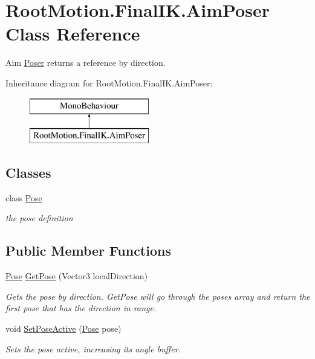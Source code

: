 \hypertarget{class_root_motion_1_1_final_i_k_1_1_aim_poser}{}\section{Root\+Motion.\+Final\+I\+K.\+Aim\+Poser Class Reference}
\label{class_root_motion_1_1_final_i_k_1_1_aim_poser}


Aim \mbox{\hyperlink{class_root_motion_1_1_final_i_k_1_1_poser}{Poser}} returns a reference by direction.  


Inheritance diagram for Root\+Motion.\+Final\+I\+K.\+Aim\+Poser\+:\begin{figure}[H]
\begin{center}
\leavevmode
\includegraphics[height=2.000000cm]{class_root_motion_1_1_final_i_k_1_1_aim_poser}
\end{center}
\end{figure}
\subsection*{Classes}
\begin{DoxyCompactItemize}
\item 
class \mbox{\hyperlink{class_root_motion_1_1_final_i_k_1_1_aim_poser_1_1_pose}{Pose}}
\begin{DoxyCompactList}\small\item\em the pose definition \end{DoxyCompactList}\end{DoxyCompactItemize}
\subsection*{Public Member Functions}
\begin{DoxyCompactItemize}
\item 
\mbox{\hyperlink{class_root_motion_1_1_final_i_k_1_1_aim_poser_1_1_pose}{Pose}} \mbox{\hyperlink{class_root_motion_1_1_final_i_k_1_1_aim_poser_a2e38d4b0d15b8076dd44e5a08890504a}{Get\+Pose}} (Vector3 local\+Direction)
\begin{DoxyCompactList}\small\item\em Gets the pose by direction. Get\+Pose will go through the poses array and return the first pose that has the direction in range. \end{DoxyCompactList}\item 
void \mbox{\hyperlink{class_root_motion_1_1_final_i_k_1_1_aim_poser_a4b925153c05eef6cb1ff51a8c90c8989}{Set\+Pose\+Active}} (\mbox{\hyperlink{class_root_motion_1_1_final_i_k_1_1_aim_poser_1_1_pose}{Pose}} pose)
\begin{DoxyCompactList}\small\item\em Sets the pose active, increasing it\textquotesingle{}s angle buffer. \end{DoxyCompactList}\end{DoxyCompactItemize}
